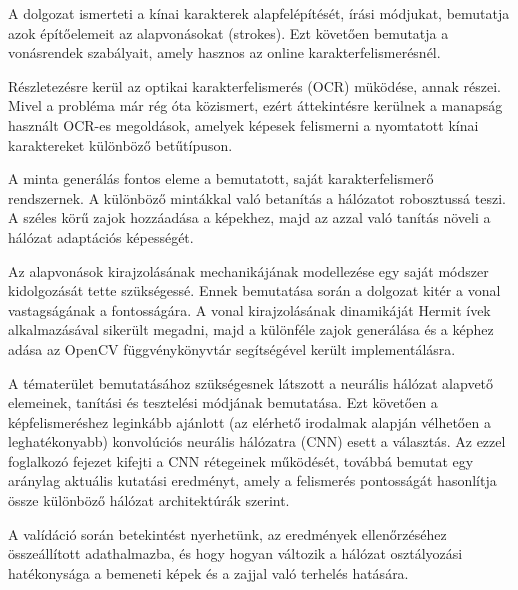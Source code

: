 
A dolgozat ismerteti a kínai karakterek alapfelépítését, írási módjukat, bemutatja azok építőelemeit az alapvonásokat (strokes). Ezt követően bemutatja a vonásrendek szabályait, amely hasznos az online karakterfelismerésnél.

Részletezésre kerül az optikai karakterfelismerés (OCR) müködése, annak részei. Mivel a probléma már rég óta közismert, ezért áttekintésre kerülnek a manapság használt OCR-es megoldások, amelyek képesek felismerni a nyomtatott kínai karaktereket különböző betűtípuson.

A minta generálás fontos eleme a bemutatott, saját karakterfelismerő rendszernek. A különböző mintákkal való betanítás a hálózatot robosztussá teszi. A széles körű zajok hozzáadása a képekhez, majd az azzal való tanítás növeli a hálózat adaptációs képességét.

Az alapvonások kirajzolásának mechanikájának modellezése egy saját módszer kidolgozását tette szükségessé. Ennek bemutatása során a dolgozat kitér a vonal vastagságának a fontosságára. A vonal kirajzolásának dinamikáját Hermit ívek alkalmazásával sikerült megadni, majd a különféle zajok generálása és a képhez adása az OpenCV függvénykönyvtár segítségével került implementálásra.

A tématerület bemutatásához szükségesnek látszott a neurális hálózat alapvető elemeinek, tanítási és tesztelési módjának bemutatása. Ezt követően a képfelismeréshez leginkább ajánlott (az elérhető irodalmak alapján vélhetően a leghatékonyabb) konvolúciós neurális hálózatra (CNN) esett a választás. Az ezzel foglalkozó fejezet kifejti a CNN rétegeinek működését, továbbá bemutat egy aránylag aktuális kutatási eredményt, amely a felismerés pontosságát hasonlítja össze különböző hálózat architektúrák szerint.

A valídáció során betekintést nyerhetünk, az eredmények ellenőrzéséhez összeállított adathalmazba, és hogy hogyan változik a hálózat osztályozási hatékonysága a bemeneti képek és a zajjal való terhelés hatására.
